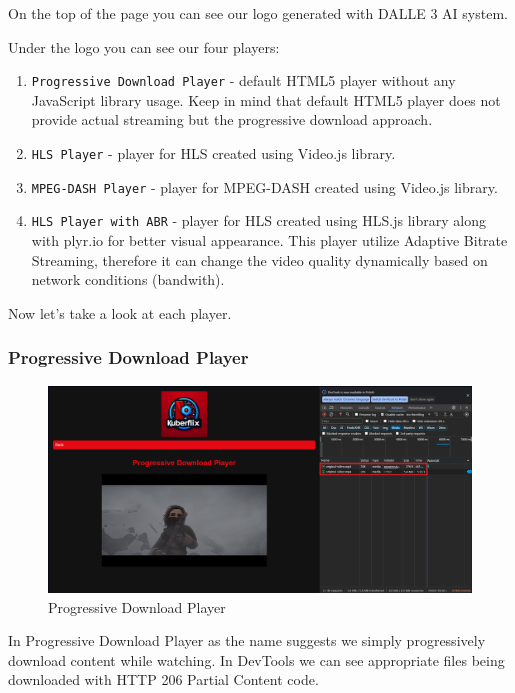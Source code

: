\documentclass{article}
\begin{document}
On the top of the page you can see our logo generated with DALLE 3 AI system.

Under the logo you can see our four players:

\begin{enumerate}
\def\labelenumi{\arabic{enumi}.}
\item
  \texttt{Progressive\ Download\ Player} - default HTML5 player without
  any JavaScript library usage. Keep in mind that default HTML5 player
  does not provide actual streaming but the progressive download
  approach.
\item
  \texttt{HLS\ Player} - player for HLS created using Video.js library.
\item
  \texttt{MPEG-DASH\ Player} - player for MPEG-DASH created using
  Video.js library.
\item
  \texttt{HLS\ Player\ with\ ABR} - player for HLS created using HLS.js
  library along with plyr.io for better visual appearance. This player
  utilize Adaptive Bitrate Streaming, therefore it can change the video
  quality dynamically based on network conditions (bandwith).
\end{enumerate}

Now let's take a look at each player.

\subsubsection{Progressive Download
Player}\label{progressive-download-player}

\begin{figure}[H]
\centering
\includegraphics[width=\textwidth]{images/2_progressive_download_player.png}
\caption{Progressive Download Player}
\end{figure}

In Progressive Download Player as the name suggests we simply
progressively download content while watching. In DevTools we can see
appropriate files being downloaded with HTTP 206 Partial Content code.
\end{document}
